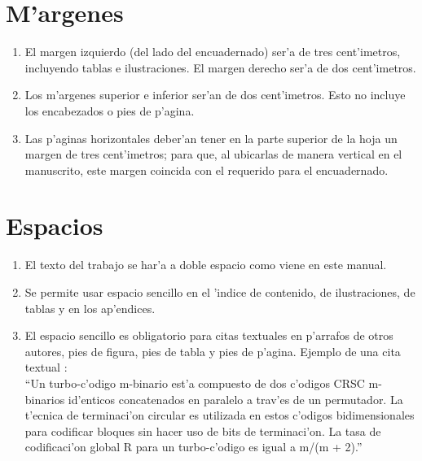 \section{M'argenes}
\noindent
\begin{enumerate}
	\item El margen izquierdo (del lado del encuadernado) ser'a de tres cent'imetros, incluyendo tablas e ilustraciones. El margen derecho ser'a de dos cent'imetros.
	\item Los m'argenes superior e inferior ser'an de dos cent'imetros. Esto no incluye los encabezados o pies de p'agina.
	\item Las p'aginas horizontales deber'an tener en la parte superior de la hoja un margen de tres cent'imetros; para que, al ubicarlas de manera vertical en el manuscrito, este margen coincida con el requerido para el encuadernado.
\end{enumerate}

\section{Espacios}
\noindent
\begin{enumerate}
	\item El texto del trabajo se har'a a doble espacio como viene en este manual.
	\item Se permite usar espacio sencillo en el 'indice de contenido, de ilustraciones, de tablas y en los ap'endices.
	\item El espacio sencillo es obligatorio para citas textuales en p'arrafos de otros autores, pies de figura, pies de tabla y pies de p'agina. Ejemplo de una cita textual \cite{Demo:phdTesis}:\\
	
	\small
	``Un turbo-c'odigo m-binario est'a compuesto de dos c'odigos CRSC m-binarios id'enticos concatenados en paralelo a trav'es de un permutador. La t'ecnica de terminaci'on circular es utilizada en estos c'odigos bidimensionales para codificar bloques sin hacer uso de bits de terminaci'on. La tasa de codificaci'on global R para un turbo-c'odigo es igual a m/(m + 2).''
\end{enumerate}

